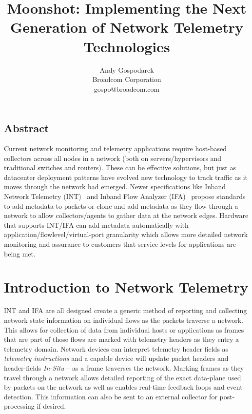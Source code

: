 \documentclass[letterpaper,twocolumn,10pt]{article}
\begin{document}
\date{}

\title{\Large \bf Moonshot: Implementing the Next Generation of Network
Telemetry Technologies}

\author{
{\rm Andy Gospodarek}\\
Broadcom Corporation\\
gospo@broadcom.com
} %

\maketitle

\subsection*{Abstract}
Current network monitoring and telemetry applications require host-based
collectors across all nodes in a network (both on servers/hypervisors
and traditional switches and routers). These can be effective solutions,
but just as datacenter deployment patterns have evolved new technology
to track traffic as it moves through the network had emerged. Newer
specifications like Inband Network Telemetry (INT)~\cite{INT} and Inband
Flow Analyzer (IFA)~\cite{IFA} propose standards to add metadata to
packets or clone and add metadata as they flow through a network to
allow collectors/agents to gather data at the network edges. Hardware
that supports INT/IFA can add metadata automatically with
application/flowlevel/virtual-port granularity which allows more
detailed network monitoring and assurance to customers that service
levels for applications are being met.

\section{Introduction to Network Telemetry}

INT and IFA are all designed create a generic method of reporting and
collecting network state information on individual flows as the packets
traverse a network.  This allows for collection of data from individual
hosts or applications as frames that are part of those flows are marked
with telemetry headers as they entry a telemetry domain.  Network
devices can interpret telemetry header fields as \textit{telemetry
instructions} and a capable device will update packet headers and
header-fields \textit{In-Situ} -- as a frame traverses the network.
Marking frames as they travel through a network allows detailed
reporting of the exact data-plane used by packets on the network as well
as enables real-time feedback loops and event detection.  This
information can also be sent to an external collector for
post-processing if desired.  
\end{document}
